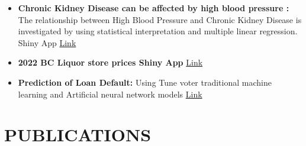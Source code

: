 \documentclass[letterpaper,11pt]{article}
\newcommand{\resumeSubHeadingListStart}{\begin{itemize}[leftmargin=*]}
\newcommand{\resumeSubHeadingListEnd}{\end{itemize}}
\begin{document}
\resumeSubHeadingListStart




  \item {\textbf{ Chronic Kidney Disease can be affected by high blood pressure :}{ The relationship between High Blood Pressure and Chronic Kidney Disease is investigated by using statistical interpretation and multiple linear regression. Shiny App}}\hspace*{0pt}\hfill
    {\color{blue}\href{https://alinemati.shinyapps.io/CKD-App-main/}{\color{blue} Link}}
    
     \item {\textbf{2022  BC Liquor store prices Shiny App}}
  \hspace*{0pt}\hfill {\href{https://alinemati.shinyapps.io/bcl_new_update/}{ \color{blue} Link}}
  
  
   \item {\textbf{Prediction of Loan Default: }}{Using Tune voter traditional machine learning and Artificial neural network models }
  \hspace*{0pt}\hfill {\href{https://drive.google.com/drive/u/0/folders/13F7ay8FIyjNs6nrtiaTEXjcNOgpWVFGj}{ \color{blue} Link}}

  \resumeSubHeadingListEnd

\section{\textbf{ PUBLICATIONS}}
\end{document}
